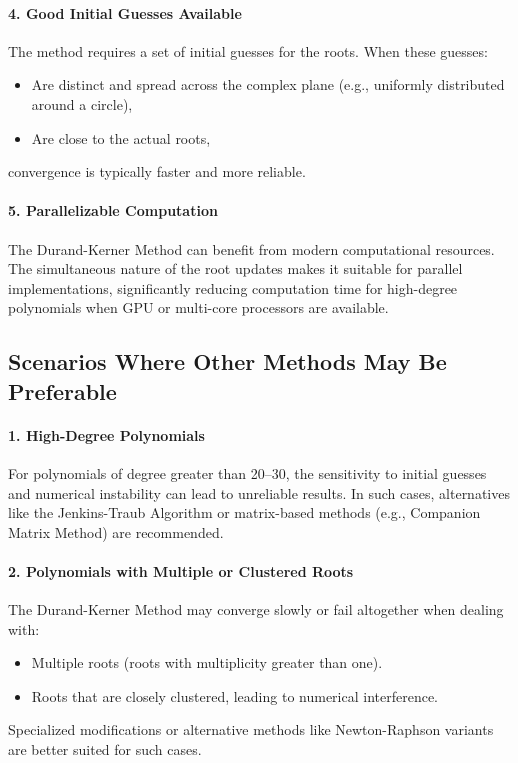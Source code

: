 \documentclass[10pt]{IEEEtran}
\begin{document}
\paragraph{4. Good Initial Guesses Available}
The method requires a set of initial guesses for the roots. When these guesses:
\begin{itemize}
    \item Are distinct and spread across the complex plane (e.g., uniformly distributed around a circle),
    \item Are close to the actual roots,
\end{itemize}
convergence is typically faster and more reliable.

\paragraph{5. Parallelizable Computation}
The Durand-Kerner Method can benefit from modern computational resources. The simultaneous nature of the root updates makes it suitable for parallel implementations, significantly reducing computation time for high-degree polynomials when GPU or multi-core processors are available.

\subsection{Scenarios Where Other Methods May Be Preferable}
\paragraph{1. High-Degree Polynomials}
For polynomials of degree greater than 20–30, the sensitivity to initial guesses and numerical instability can lead to unreliable results. In such cases, alternatives like the Jenkins-Traub Algorithm or matrix-based methods (e.g., Companion Matrix Method) are recommended.\cite{reinkeWeierstrassDurandKerner2022,kotsireasSurveyMethodsSolving2022}

\paragraph{2. Polynomials with Multiple or Clustered Roots}
The Durand-Kerner Method may converge slowly or fail altogether when dealing with:
\begin{itemize}
    \item Multiple roots (roots with multiplicity greater than one).
    \item Roots that are closely clustered, leading to numerical interference.
\end{itemize}
Specialized modifications or alternative methods like Newton-Raphson variants are better suited for such cases.
\end{document}
